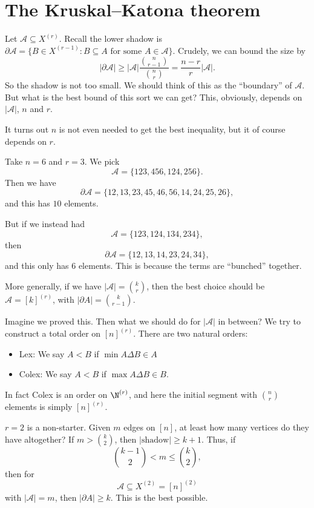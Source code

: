\documentclass[a4paper]{article}
\begin{document}
\section{The Kruskal--Katona theorem}
Let $\mathcal{A} \subseteq X^{(r)}$. Recall the lower shadow is $\partial \mathcal{A} = \{B \in X^{(r - 1)} : B \subseteq A \text{ for some } A \in \mathcal{A}\}$. Crudely, we can bound the size by
\[
  |\partial \mathcal{A}| \geq |\mathcal{A}| \frac{\binom{n}{r - 1}}{\binom{n}{r}} = \frac{n - r}{r} |\mathcal{A}|.
\]
So the shadow is not too small. We should think of this as the ``boundary'' of $\mathcal{A}$. But what is the best bound of this sort we can get? This, obviously, depends on $|\mathcal{A}|$, $n$ and $r$.

It turns out $n$ is not even needed to get the best inequality, but it of course depends on $r$.

\begin{eg}
  Take $n = 6$ and $r = 3$. We pick
  \[
    \mathcal{A} = \{123, 456, 124, 256\}.
  \]
  Then we have
  \[
    \partial \mathcal{A} = \{12, 13, 23, 45, 46, 56, 14, 24, 25, 26\},
  \]
  and this has $10$ elements.

  But if we instead had
  \[
    \mathcal{A} = \{123, 124, 134, 234\},
  \]
  then
  \[
    \partial \mathcal{A} = \{12, 13, 14, 23, 24, 34\},
  \]
  and this only has $6$ elements. This is because the terms are ``bunched'' together.
\end{eg}
More generally, if we have $|\mathcal{A}| = \binom{k}{r}$, then the best choice should be $\mathcal{A} = [k]^{(r)}$, with $|\partial A| = \binom{k}{r - 1}$.

Imagine we proved this. Then what we should do for $|\mathcal{A}|$ in between? We try to construct a total order on $[n]^{(r)}$. There are two natural orders:
\begin{itemize}
  \item Lex: We say $A < B$ if $\min A \Delta B \in A$
  \item Colex: We say $A < B$ if $\max A \Delta B \in B$.
\end{itemize}

In fact Colex is an order on $\N^{(r)}$, and here the initial segment with $\binom{n}{r}$ elements is simply $[n]^{(r)}$.

$r = 2$ is a non-starter. Given $m$ edges on $[n]$, at least how many vertices do they have altogether? If $m > \binom{k}{2}$, then $|\mathrm{shadow}| \geq k + 1$. Thus, if
\[
  \binom{k - 1}{2} < m \leq \binom{k}{2},
\]
then for
\[
  \mathcal{A} \subseteq X^{(2)} = [n]^{(2)}
\]
with $|\mathcal{A}| = m$, then $|\partial A| \geq k$. This is the best possible.
\end{document}
